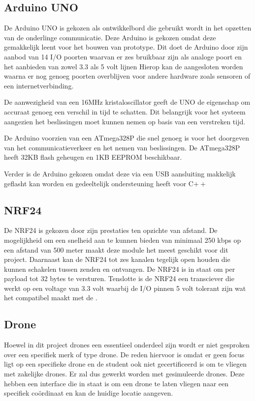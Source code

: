 \documentclass[a4paper, 11pt, oneside]{report}
\begin{document}
\subsection{Arduino UNO}
\label{inleiding:werkomgeving:arduino}
De Arduino UNO is gekozen als ontwikkelbord die gebruikt wordt in het opzetten van de onderlinge communicatie.
Deze Arduino is gekozen omdat deze gemakkelijk leent voor het bouwen van prototype.
Dit doet de Arduino door zijn aanbod van 14 I/O poorten waarvan er zes bruikbaar zijn als analoge poort en het aanbieden van zowel 3.3 als 5 volt lijnen
Hierop kan de  aangesloten worden waarna er nog genoeg poorten overblijven voor andere hardware zoals sensoren of een internetverbinding.

De aanwezigheid van een 16MHz kristaloscillator geeft de UNO de eigenschap om accuraat genoeg een verschil in tijd te schatten.
Dit belangrijk voor het systeem aangezien het beslissingen moet kunnen nemen op basis van een verstreken tijd.

De Arduino voorzien van een ATmega328P die snel genoeg is voor het doorgeven van het communicatieverkeer en het nemen van beslissingen. 
De ATmega328P heeft 32KB flash geheugen  en 1KB EEPROM beschikbaar.  

Verder is de Arduino gekozen omdat deze via een USB aansluiting makkelijk geflasht kan worden en gedeeltelijk ondersteuning heeft voor C$++$

\subsection{NRF24}
\label{inleiding:werkomgeving:nrf24}
De NRF24 is gekozen door zijn prestaties ten opzichte van afstand.
De mogelijkheid om een snelheid aan te kunnen bieden van minimaal 250 kbps op een afstand van 500 meter maakt deze module het meest geschikt voor dit project.
Daarnaast kan de NRF24 tot zes kanalen tegelijk open houden die kunnen schakelen tussen zenden en ontvangen.
De NRF24 is in staat om per payload tot 32 bytes te versturen. 
Tenslotte is de NRF24 een transciever die werkt op een voltage van 3.3 volt waarbij de I/O pinnen 5 volt tolerant zijn wat het compatibel maakt met de .

\subsection{Drone}
\label{inleiding:werkomgeving:drone}
Hoewel in dit project drones een essentieel onderdeel zijn wordt er niet gesproken over een specifiek merk of type drone.
De reden hiervoor is omdat er geen focus ligt op een specifieke drone en de student ook niet gecertificeerd is om te vliegen met zakelijke drones.
Er zal dus gewerkt worden met gesimuleerde drones. 
Deze hebben een interface die in staat is om een drone te laten vliegen naar een specifiek coördinaat en kan de huidige locatie aangeven.
\end{document}
